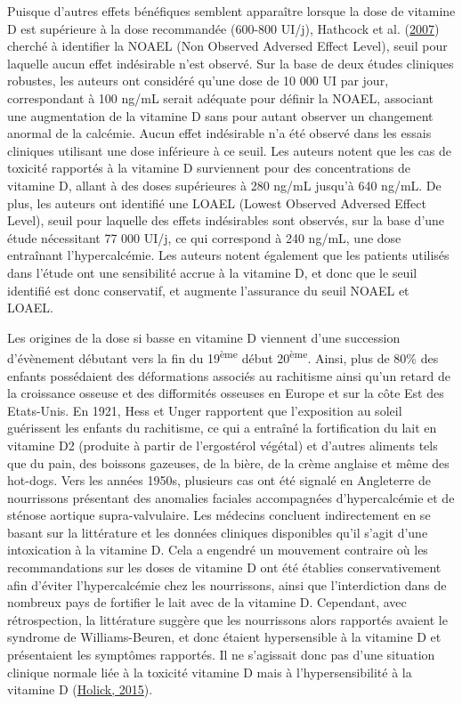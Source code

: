 \documentclass[
  a4paper,
  DIV=11,
  numbers=noendperiod,
  listof=totoc]{scrreprt}
\begin{document}
Puisque d'autres effets bénéfiques semblent apparaître lorsque la dose
de vitamine D est supérieure à la dose recommandée (600-800 UI/j),
Hathcock et al. (\protect\hyperlink{ref-Hathcock.2007ev5}{2007}) cherché
à identifier la NOAEL (Non Observed Adversed Effect Level), seuil pour
laquelle aucun effet indésirable n'est observé. Sur la base de deux
études cliniques robustes, les auteurs ont considéré qu'une dose de 10
000 UI par jour, correspondant à 100 ng/mL serait adéquate pour définir
la NOAEL, associant une augmentation de la vitamine D sans pour autant
observer un changement anormal de la calcémie. Aucun effet indésirable
n'a été observé dans les essais cliniques utilisant une dose inférieure
à ce seuil. Les auteurs notent que les cas de toxicité rapportés à la
vitamine D surviennent pour des concentrations de vitamine D, allant à
des doses supérieures à 280 ng/mL jusqu'à 640 ng/mL. De plus, les
auteurs ont identifié une LOAEL (Lowest Observed Adversed Effect Level),
seuil pour laquelle des effets indésirables sont observés, sur la base
d'une étude nécessitant 77 000 UI/j, ce qui correspond à 240 ng/mL, une
dose entraînant l'hypercalcémie. Les auteurs notent également que les
patients utilisés dans l'étude ont une sensibilité accrue à la vitamine
D, et donc que le seuil identifié est donc conservatif, et augmente
l'assurance du seuil NOAEL et LOAEL.

Les origines de la dose si basse en vitamine D viennent d'une succession
d'évènement débutant vers la fin du 19\textsuperscript{ème} début
20\textsuperscript{ème}. Ainsi, plus de 80\% des enfants possédaient des
déformations associés au rachitisme ainsi qu'un retard de la croissance
osseuse et des difformités osseuses en Europe et sur la côte Est des
Etats-Unis. En 1921, Hess et Unger rapportent que l'exposition au soleil
guérissent les enfants du rachitisme, ce qui a entraîné la fortification
du lait en vitamine D2 (produite à partir de l'ergostérol végétal) et
d'autres aliments tels que du pain, des boissons gazeuses, de la bière,
de la crème anglaise et même des hot-dogs. Vers les années 1950s,
plusieurs cas ont été signalé en Angleterre de nourrissons présentant
des anomalies faciales accompagnées d'hypercalcémie et de sténose
aortique supra-valvulaire. Les médecins concluent indirectement en se
basant sur la littérature et les données cliniques disponibles qu'il
s'agit d'une intoxication à la vitamine D. Cela a engendré un mouvement
contraire où les recommandations sur les doses de vitamine D ont été
établies conservativement afin d'éviter l'hypercalcémie chez les
nourrissons, ainsi que l'interdiction dans de nombreux pays de fortifier
le lait avec de la vitamine D. Cependant, avec rétrospection, la
littérature suggère que les nourrissons alors rapportés avaient le
syndrome de Williams-Beuren, et donc étaient hypersensible à la vitamine
D et présentaient les symptômes rapportés. Il ne s'agissait donc pas
d'une situation clinique normale liée à la toxicité vitamine D mais à
l'hypersensibilité à la vitamine D
(\protect\hyperlink{ref-Holick.2015}{Holick, 2015}).
\end{document}
